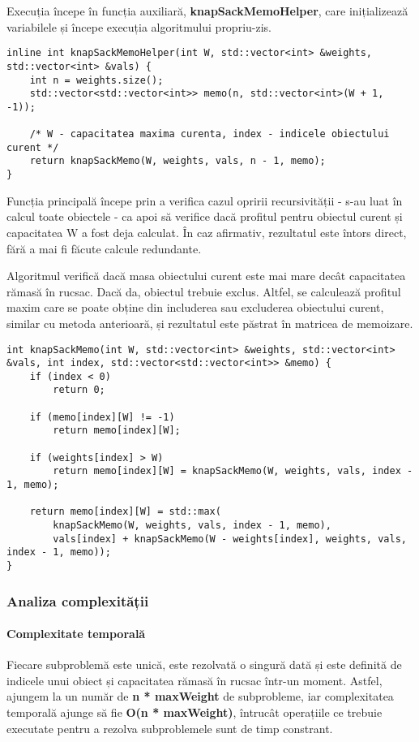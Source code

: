 \documentclass[runningheads]{llncs}
\begin{document}
{Execuția începe în funcția auxiliară, \textbf{knapSackMemoHelper}, care inițializează variabilele
și începe execuția algoritmului propriu-zis.

\begin{lstlisting}
inline int knapSackMemoHelper(int W, std::vector<int> &weights, std::vector<int> &vals) {
	int n = weights.size();
	std::vector<std::vector<int>> memo(n, std::vector<int>(W + 1, -1));

	/* W - capacitatea maxima curenta, index - indicele obiectului curent */
	return knapSackMemo(W, weights, vals, n - 1, memo);
}
\end{lstlisting}

Funcția principală începe prin a verifica cazul opririi recursivității - s-au
luat în calcul toate obiectele - ca apoi să verifice dacă profitul pentru obiectul
curent și capacitatea W a fost deja calculat. În caz afirmativ, rezultatul este întors
direct, fără a mai fi făcute calcule redundante.

Algoritmul verifică dacă masa obiectului curent este mai mare decât capacitatea rămasă
în rucsac. Dacă da, obiectul trebuie exclus. Altfel, se calculează profitul maxim care
se poate obține din includerea sau excluderea obiectului curent, similar cu metoda anterioară,
și rezultatul este păstrat în matricea de memoizare.

\begin{lstlisting}
int knapSackMemo(int W, std::vector<int> &weights, std::vector<int> &vals, int index, std::vector<std::vector<int>> &memo) {
	if (index < 0)
		return 0;
	
	if (memo[index][W] != -1)
		return memo[index][W];

	if (weights[index] > W)
		return memo[index][W] = knapSackMemo(W, weights, vals, index - 1, memo);

	return memo[index][W] = std::max(
		knapSackMemo(W, weights, vals, index - 1, memo),
		vals[index] + knapSackMemo(W - weights[index], weights, vals, index - 1, memo));
}
\end{lstlisting}

\subsubsection{Analiza complexității}

\paragraph{Complexitate temporală} Fiecare subproblemă este unică, este rezolvată o singură
dată și este definită de indicele unui obiect și capacitatea rămasă în rucsac într-un moment.
Astfel, ajungem la un număr de \textbf{n * maxWeight} de subprobleme, iar complexitatea
temporală ajunge să fie \textbf{O(n * maxWeight)}, întrucât operațiile ce trebuie executate
pentru a rezolva subproblemele sunt de timp constrant.

}
\end{document}
